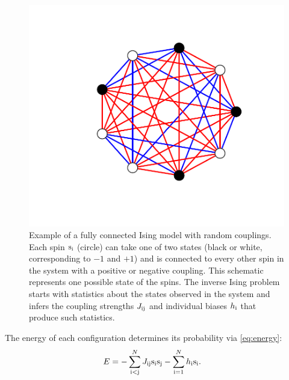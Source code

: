 \documentclass[aps,prl,twocolumn,nofootinbib]{revtex4-1}
\begin{document}
\begin{figure}[tbp]\centering
	\includegraphics[width=.85\linewidth,clip,trim={100 70 70 60}]{../images/ising_example}
\caption{Example of a fully connected Ising model with random couplings. Each spin ${\rm s}_{\rm i}$ (circle) can take one of two states (black or white, corresponding to $-1$ and $+1$) and is connected to every other spin in the system with a positive or negative coupling.  This schematic represents one possible state of the spins.  The inverse Ising problem starts with statistics about the states observed in the system and infers the coupling strengths $J_{\rm ij}$ and individual biases $h_{\rm i}$ that produce such statistics. }
\label{gr:ising}
\end{figure}

The energy of each configuration determines its probability via \eqref{eq:energy}:
\begin{align}
	E &= -\sum_{\rm i<j}^N J_{\rm ij}{\rm s}_{\rm i}{\rm s}_{\rm j} -\sum_{\rm i=1}^Nh_{\rm i}{\rm s}_{\rm i}.
\end{align}
\end{document}
